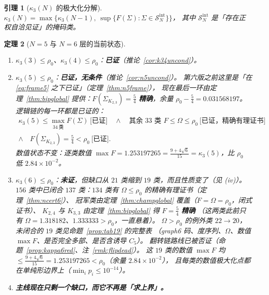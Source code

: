 \documentclass[UTF8,11pt]{ctexart}
\newtheorem{theorem}{定理}[section]
\newtheorem{lemma}[theorem]{引理}
\theoremstyle{definition}
\begin{document}
\begin{lemma}[$\kappa_3(N)$ 的极大化分解]\label{lem:kappamax}
$\kappa_3(N)=\max\bigl\{\kappa_3(N-1),\ \sup\{F(\Sigma):\Sigma\in\mathcal S_N^{\mathrm{int}}\}\bigr\}$，
其中 $\mathcal S_N^{\mathrm{int}}$ 是「存在\emph{正权}自洽见证」的掩码类。
\end{lemma}

\begin{theorem}[$N=5$ 与 $N=6$ 层的当前状态]\label{thm:n6closed}
\begin{enumerate}[label=(\roman*),leftmargin=2em]
\item $\kappa_3(3)\le\rho_0$、$\kappa_3(4)\le\rho_0$：\textbf{已证}（推论~\ref{cor:k34uncond}）。
\item $\kappa_3(5)\le\rho_0$：\textbf{已证，无条件}（推论~\ref{cor:n5uncond}）。
第六版之前这里是「在 \eqref{eq:frame5} 之下已证」（定理~\ref{thm:n5frame}），
现在最后一环由定理~\ref{thm:bipglobal} 提供：$F(\Sigma_{K_{2,3}})=\frac54$ \textbf{精确}，余量 $\rho_0-\frac54=0.031568197$。
逻辑链的每一环都是已证的：
\[
\begin{gathered}
\kappa_3(5)\le\max_{34\ \text{类}}F(\Sigma)\ \textbf{[已证]}\quad\wedge\quad
\text{其余 }33\text{ 类 }F\le\Omega\le\rho_0\ \textbf{[已证，精确有理证书]}\\
\wedge\quad F(\Sigma_{K_{2,3}})=\tfrac54<\rho_0\ \textbf{[已证]} .
\end{gathered}
\]
数值状态不变：逐类数值 $\max F=1.253197265=\frac{9+4\sqrt6}{15}=\kappa_3(5)$，比 $\rho_0$ 低 $2.84\times10^{-2}$。
\item $\kappa_3(6)\le\rho_0$：\textbf{未证}，但缺口从 $21$ 类缩到 $19$ 类，而且\emph{性质}变了（见 (iv)）。
$156$ 类中已闭合 $137$ 类：$134$ 类有 $\Omega\le\rho_0$ 的精确有理证书（定理~\ref{thm:ncert6}）、
冠军类由定理~\ref{thm:champglobal} 覆盖（$F=\Omega=\rho_0$，闭式证书）、
$K_{2,4}$ 与 $K_{3,3}$ 由定理~\ref{thm:bipglobal} 得 $F=\frac54$ \textbf{精确}
（这两类此前只有 $\Omega=1.318182$、$1.333333>\rho_0$，一直悬着）。
$\Omega>\rho_0$ 的例外类 $22\to20$，未闭合的 $19$ 类见命题~\ref{prop:tab19} 的完整表
（graph6 码、度序列、$\Omega$、数值 $\max F$、是否完全多部、是否含诱导 $C_5$）。
翻转链路线已被否证（命题~\ref{prop:kappa6red}、注~\ref{rmk:flipdead}）。
这 $19$ 类的数值 $\max F$ 均 $\le\frac{9+4\sqrt6}{15}=1.253197265<\rho_0$（余量 $2.84\times10^{-2}$），
且每类的数值极大化点都在单纯形边界上（$\min_ip_i\le10^{-14}$）。
\item \textbf{主线现在只剩一个缺口，而它不再是「求上界」。}


\end{enumerate}
\end{theorem}
\end{document}
